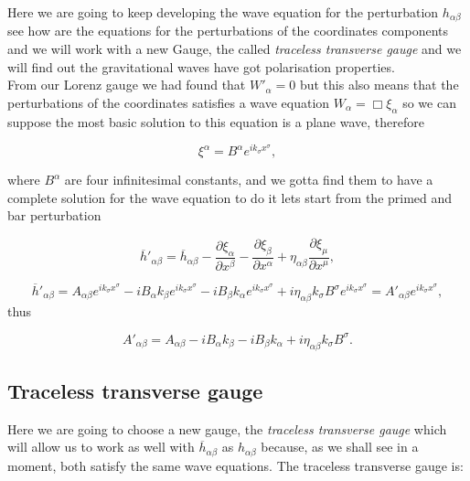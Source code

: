     Here we are going to keep developing the wave equation for the perturbation $h_{\alpha\beta}$ see how are the equations for the perturbations of the coordinates components and we will work with a new Gauge, the called \textit{traceless transverse gauge} and we will find out the gravitational waves have got polarisation properties. \\

    From our Lorenz gauge we had found that $W'_{\alpha} = 0$ but this also means that the perturbations of the coordinates satisfies a wave equation $W_{\alpha}=\Box \xi_{\alpha}$ so we can suppose the most basic solution to this equation is a plane wave, therefore

    \begin{equation}
        \xi^{\alpha} = B^{\alpha}e^{ik_{\sigma}x^{\sigma}},
    \end{equation}

    where $B^{\alpha}$ are four infinitesimal constants, and we gotta find them to have a complete solution for the wave equation to do it lets start from the primed and bar perturbation

    \begin{equation}
        \overline{h}'_{\alpha\beta} = \overline{h}_{\alpha\beta} - \frac{\partial \xi_{\alpha}}{\partial x^{\beta}} - \frac{\partial \xi_{\beta}}{\partial x^{\alpha}} + \eta_{\alpha\beta  }\frac{\partial \xi_{\mu}}{\partial x^{\mu}},
    \end{equation}

    \begin{equation}
        \overline{h}'_{\alpha\beta} = A_{\alpha\beta}e^{ik_{\sigma}x^{\sigma}} - iB_{\alpha}k_{\beta}e^{ik_{\sigma}x^{\sigma}} - iB_{\beta}k_{\alpha}e^{ik_{\sigma}x^{\sigma}} + i \eta_{\alpha\beta}k_{\sigma}B^{\sigma} e^{ik_{\sigma}x^{\sigma}} = A'_{\alpha\beta}e^{ik_{\sigma}x^{\sigma}},
    \end{equation}
    thus

    \begin{equation}\label{eq:Aprima}
        A'_{\alpha\beta} = A_{\alpha\beta}  - iB_{\alpha}k_{\beta} - i B_{\beta}k_{\alpha} + i \eta_{\alpha\beta}k_{\sigma}B^{\sigma}.
    \end{equation}

    \subsection{Traceless transverse gauge}

        Here we are going to choose a new gauge, the \textit{traceless transverse gauge} which will allow us to work as well with $\overline{h}_{\alpha\beta}$ as $h_{\alpha\beta}$ because, as we shall see in a moment, both satisfy the same wave equations. The traceless transverse gauge is:

